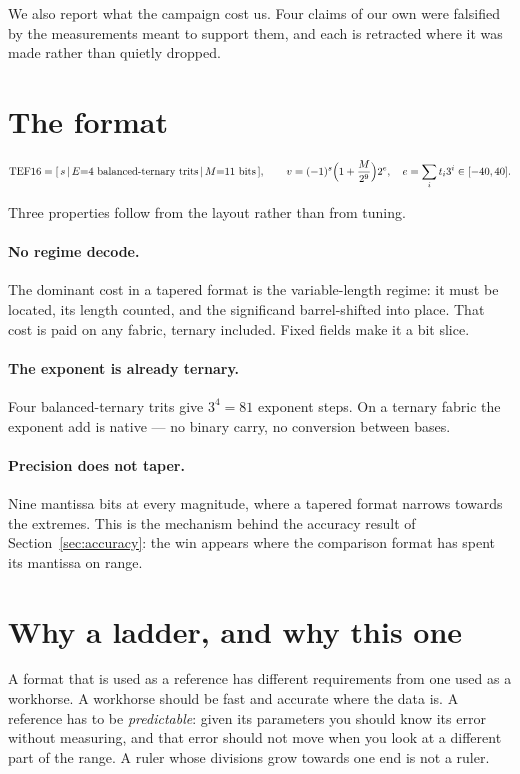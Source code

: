 \documentclass[11pt]{article}
\theoremstyle{definition}
\begin{document}
We also report what the campaign cost us. Four claims of our own were falsified by
the measurements meant to support them, and each is retracted where it was made
rather than quietly dropped.

\section{The format}\label{sec:format}

\begin{equation}
\text{TEF16}=[\,s\,|\,E{=}4\ \text{balanced-ternary trits}\,|\,M{=}11\ \text{bits}\,],
\qquad
v=(-1)^{s}\Bigl(1+\frac{M}{2^{9}}\Bigr)2^{e},
\quad e=\sum_{i} t_i 3^i \in [-40,40].
\end{equation}

Three properties follow from the layout rather than from tuning.

\paragraph{No regime decode.} The dominant cost in a tapered format is the
variable-length regime: it must be located, its length counted, and the
significand barrel-shifted into place. That cost is paid on any fabric, ternary
included. Fixed fields make it a bit slice.

\paragraph{The exponent is already ternary.} Four balanced-ternary trits give
$3^4=81$ exponent steps. On a ternary fabric the exponent add is native --- no
binary carry, no conversion between bases.

\paragraph{Precision does not taper.} Nine mantissa bits at every magnitude,
where a tapered format narrows towards the extremes. This is the mechanism behind
the accuracy result of Section~\ref{sec:accuracy}: the win appears where the
comparison format has spent its mantissa on range.


\section{Why a ladder, and why this one}\label{sec:ruler}

A format that is used as a reference has different requirements from one used as
a workhorse. A workhorse should be fast and accurate where the data is. A
reference has to be \emph{predictable}: given its parameters you should know its
error without measuring, and that error should not move when you look at a
different part of the range. A ruler whose divisions grow towards one end is not
a ruler.
\end{document}
